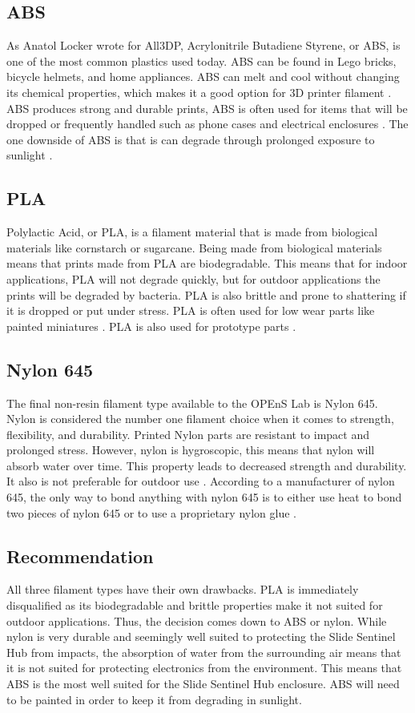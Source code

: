 \documentclass[onecolumn, draftclsnofoot,10pt, compsoc]{IEEEtran}
\begin{document}
    \subsection{ABS}
        As Anatol Locker wrote for All3DP, Acrylonitrile Butadiene Styrene, or ABS, is one of the most common plastics used today. ABS can be found in Lego bricks, bicycle helmets, and home appliances. ABS can melt and cool without changing its chemical properties, which makes it a good option for 3D printer filament \cite{website:ABS}. ABS produces strong and durable prints, ABS is often used for items that will be dropped or frequently handled such as phone cases and electrical enclosures \cite{website:Filament_Types}. The one downside of ABS is that is can degrade through prolonged exposure to sunlight \cite{website:ABS}.  
    \subsection{PLA}
        Polylactic Acid, or PLA, is a filament material that is made from biological materials like cornstarch or sugarcane. Being made from biological materials means that prints made from PLA are biodegradable. This means that for indoor applications, PLA will not degrade quickly, but for outdoor applications the prints will be degraded by bacteria. PLA is also brittle and prone to shattering if it is dropped or put under stress. PLA is often used for low wear parts like painted miniatures \cite{website:Toms}. PLA is also used for prototype parts \cite{website:Filament_Types}.
    \subsection{Nylon 645}
        The final non-resin filament type available to the OPEnS Lab is Nylon 645. Nylon is considered the number one filament choice when it comes to strength, flexibility, and durability. Printed Nylon parts are resistant to impact and prolonged stress. However, nylon is hygroscopic, this means that nylon will absorb water over time. This property leads to decreased strength and durability. It also is not preferable for outdoor use \cite{website:Filament_Types}. According to a manufacturer of nylon 645, the only way to bond anything with nylon 645 is to either use heat to bond two pieces of nylon 645 or to use a proprietary nylon glue \cite{website:645}.
    \subsection{Recommendation}
        All three filament types have their own drawbacks. PLA is immediately disqualified as its biodegradable and brittle properties make it not suited for outdoor applications. Thus, the decision comes down to ABS or nylon. While nylon is very durable and seemingly well suited to protecting the Slide Sentinel Hub from impacts, the absorption of water from the surrounding air means that it is not suited for protecting electronics from the environment. This means that ABS is the most well suited for the Slide Sentinel Hub enclosure. ABS will need to be painted in order to keep it from degrading in sunlight.
        
\end{document}
